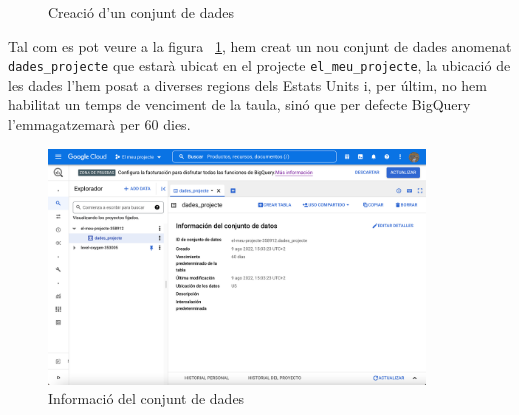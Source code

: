 \documentclass[12pt,longbibliography]{article}
\theoremstyle{definition}
\theoremstyle{remark}
\begin{document}
\begin{figure}[h!]
\par
{}%
\hfill
{}%
\par
\caption{Creació d'un conjunt de dades}
\label{fig:bq3}
\end{figure}


Tal com es pot veure a la figura ~\ref{fig:bq3}, hem creat un nou conjunt de dades anomenat \verb|dades_projecte| que estarà ubicat en el projecte \verb|el_meu_projecte|, la ubicació de les dades l'hem posat a diverses regions dels Estats Units i, per últim, no hem habilitat un temps de venciment de la taula, sinó que per defecte BigQuery l'emmagatzemarà per 60 dies.


\begin{figure}[h!]
\begin{center}
\includegraphics[width=10cm]{bq5}
\end{center}
\caption{Informació del conjunt de dades}
\label{fig:bq5}
\end{figure}
\end{document}
